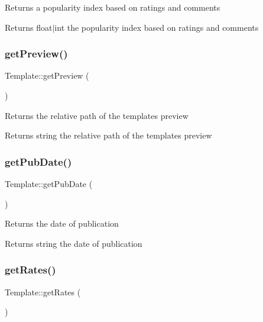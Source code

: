 Returns a popularity index based on ratings and comments \begin{DoxyReturn}{Returns}
float$\vert$int the popularity index based on ratings and comments 
\end{DoxyReturn}
\mbox{\label{classTemplate_a7be2f649d0d6366226de02d40128fcc0}} 
\subsubsection{\texorpdfstring{get\+Preview()}{getPreview()}}
{\footnotesize\ttfamily Template\+::get\+Preview (\begin{DoxyParamCaption}{ }\end{DoxyParamCaption})}

Returns the relative path of the template\textquotesingle{}s preview \begin{DoxyReturn}{Returns}
string the relative path of the template\textquotesingle{}s preview 
\end{DoxyReturn}
\mbox{\label{classTemplate_af108b77d2539d6a5836ba22d662048ed}} 
\subsubsection{\texorpdfstring{get\+Pub\+Date()}{getPubDate()}}
{\footnotesize\ttfamily Template\+::get\+Pub\+Date (\begin{DoxyParamCaption}{ }\end{DoxyParamCaption})}

Returns the date of publication \begin{DoxyReturn}{Returns}
string the date of publication 
\end{DoxyReturn}
\mbox{\label{classTemplate_a3be5163aadc141778882b8d4bcdcc54e}} 
\subsubsection{\texorpdfstring{get\+Rates()}{getRates()}}
{\footnotesize\ttfamily Template\+::get\+Rates (\begin{DoxyParamCaption}{ }\end{DoxyParamCaption})}

